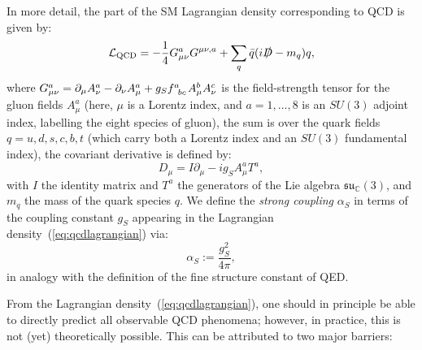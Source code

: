 \documentclass[withindex,glossary]{cam-thesis}
\begin{document}
In more detail, the part of the SM Lagrangian density corresponding to QCD is given by:
\begin{equation}
\label{eq:qcdlagrangian}
\mathcal{L}_{\text{QCD}} = -\frac{1}{4} G_{\mu\nu}^a G^{\mu\nu,a} + \sum_{q} \bar{q} (i \slashed{D} - m_q) q,
\end{equation}
where $G_{\mu\nu}^a = \partial_{\mu} A^a_{\nu} - \partial_{\nu} A^a_{\mu} + g_S \tensor{f}{^a_{bc}} A^b_{\mu} A^c_{\nu}$ is the field-strength tensor for the gluon fields $A^a_{\mu}$ (here, $\mu$ is a Lorentz index, and $a = 1,...,8$ is an $SU(3)$ adjoint index, labelling the eight species of gluon), the sum is over the quark fields $q = u, d, s, c, b, t$ (which carry both a Lorentz index and an $SU(3)$ fundamental index), the covariant derivative is defined by:
\begin{equation}
\label{eq:qcd_derivative}
D_{\mu} = I\partial_{\mu} - i g_S A_{\mu}^a T^a,
\end{equation}
with $I$ the identity matrix and $T^a$ the generators of the Lie algebra $\mathfrak{su}_{\mathbb{C}}(3)$, and $m_q$ the mass of the quark species $q$. We define the \textit{strong coupling} $\alpha_S$ in terms of the coupling constant $g_S$ appearing in the Lagrangian density~(\ref{eq:qcdlagrangian}) via:
\begin{equation}
\alpha_S := \frac{g_S^2}{4\pi},
\end{equation}
in analogy with the definition of the fine structure constant of QED. 

From the Lagrangian density~(\ref{eq:qcdlagrangian}), one should in principle be able to directly predict all observable QCD phenomena; however, in practice, this is not (yet) theoretically possible. This can be attributed to two major barriers:
\end{document}
